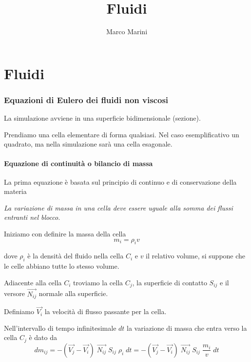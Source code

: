 \documentclass[a4paper,11pt]{article}
\title{Fluidi}
\author{Marco Marini}
\begin{document}
\maketitle
\tableofcontents

\begin{abstract}
\end{abstract}

\part{Fluidi}

\section{Equazioni di Eulero dei fluidi non viscosi}

La simulazione avviene in una superficie bidimensionale (sezione).

Prendiamo una cella elementare di forma qualsiasi.
Nel caso esemplificativo un quadrato, ma nella simulazione sarà una cella esagonale.

\subsection{Equazione di continuità o bilancio di massa} 

La prima equazione è basata sul principio di continuo e di conservazione della materia

\emph{
La variazione di massa in una cella deve essere uguale alla somma dei flussi entranti nel blocco.
}
 
Iniziamo con definire la massa della cella 
\begin{equation}
    m_i = \rho_i v
\end{equation}

dove $ \rho_i $ è la densità del fluido nella cella $ C_i $ e $ v $ il relativo volume, si suppone che le celle abbiano tutte lo stesso volume. 

Adiacente alla cella $ C_i $ troviamo la cella $ C_j $, la superficie di contatto $ S_{ij} $ e il versore $ \vec{N_{ij}} $ normale alla superficie.

Definiamo $ \vec{V_i} $ la velocità di flusso passante per la cella.
  
Nell'intervallo di tempo infinitesimale $ dt $ la variazione di massa che entra verso la cella $ C_j $ è dato da  
\begin{equation}
	d m_{ij} = -( \vec{V_j} -  \vec{V_i} )\; \vec{N_{ij}} \; S_{ij} \; \rho_i \; dt
	=-( \vec{V_j} - \vec{V_i}) \; \vec{N_{ij}} \; S_{ij} \; \frac{m_i}{v} \; dt
\end{equation}
\end{document}
